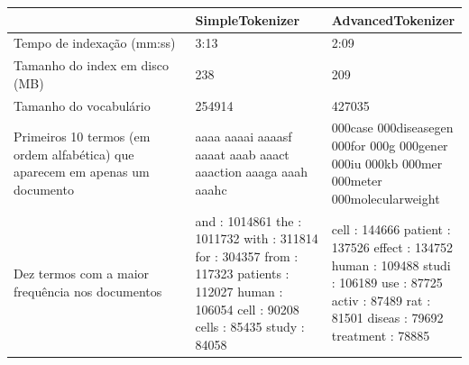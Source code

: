 \documentclass[12pt]{article}
\begin{document}
\begin{tabular}{| p{0.4\linewidth} | p{0.3\linewidth} | p{0.3\linewidth} |}
        \hline
        & \bf SimpleTokenizer & \bf AdvancedTokenizer \\ \hline
        Tempo de indexação (mm:ss) & 3:13 & 2:09 \\ \hline
        Tamanho do index em disco (MB) & 238 & 209 \\ \hline
        Tamanho do vocabulário & 254914 & 427035\\ \hline
        Primeiros 10 termos (em ordem
        alfabética) que aparecem em
        apenas um documento
        &
        aaaa \newline
        aaaai \newline
        aaaasf \newline
        aaaat \newline
        aaab \newline
        aaact \newline
        aaaction \newline
        aaaga \newline
        aaah \newline
        aaahc
        &
        000case \newline
        000diseasegen \newline
        000for \newline
        000g \newline
        000gener \newline
        000iu \newline
        000kb \newline
        000mer \newline
        000meter \newline
        000molecularweight
        \\ \hline
        Dez termos com a maior frequência nos documentos
        &
       and : 1014861 \newline
       the : 1011732 \newline
      with : 311814 \newline
       for : 304357 \newline
      from : 117323 \newline
  patients : 112027 \newline
     human : 106054 \newline
      cell : 90208 \newline
     cells : 85435 \newline
     study : 84058
     &
      cell : 144666 \newline
   patient : 137526 \newline
    effect : 134752 \newline
     human : 109488 \newline
     studi : 106189 \newline
       use : 87725 \newline
     activ : 87489 \newline
       rat : 81501 \newline
    diseas : 79692 \newline
 treatment : 78885
     \\
    \hline
\end{tabular}
\end{document}
